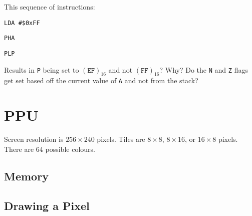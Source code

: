 \documentclass[10pt, draft]{book}
\begin{document}
  This sequence of instructions:

  \texttt{LDA \#\$0xFF}

  \texttt{PHA}

  \texttt{PLP}

  \noindent Results in \texttt{P} being set to $(\texttt{EF})_{16}$ and not
  $(\texttt{FF})_{16}$? Why? Do the \texttt{N} and \texttt{Z} flags get set
  based off the current value of \texttt{A} and not from the stack?

  \chapter{PPU}

  Screen resolution is $256 \times 240$ pixels.
  Tiles are $8 \times 8$, $8 \times 16$, or $16 \times 8$ pixels.
  There are $64$ possible colours.

  \section{Memory}

  \section{Drawing a Pixel}
\end{document}
